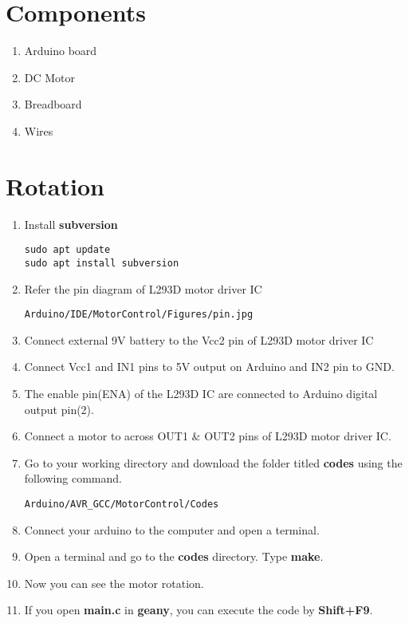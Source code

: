 \documentclass[journal,12pt,twocolumn]{IEEEtran}
\begin{document}
\section{Components}
 \begin{enumerate}
    \item Arduino board
    \item DC Motor
    \item Breadboard
    \item Wires
 \end{enumerate}

\section{Rotation}
\begin{enumerate}
\item Install \textbf{subversion}
\begin{lstlisting}
sudo apt update
sudo apt install subversion
\end{lstlisting}
\item Refer the pin diagram of L293D motor driver IC
    \begin{lstlisting}
Arduino/IDE/MotorControl/Figures/pin.jpg
    \end{lstlisting}
\item Connect external 9V battery to the Vcc2 pin of L293D motor driver IC
\item  Connect Vcc1 and IN1 pins to 5V output on Arduino and IN2 pin to GND.
\item  The enable pin(ENA) of the L293D IC are connected to Arduino digital output pin(2).
\item  Connect a motor to across OUT1 \& OUT2 pins of L293D motor driver IC.
\item Go to your working directory and download the folder titled \textbf{codes} using the following command.
\begin{lstlisting}
Arduino/AVR_GCC/MotorControl/Codes
\end{lstlisting}
\item Connect your arduino to the computer and open a terminal. 
\item Open a terminal and go to  the \textbf{codes} directory.  Type \textbf{make}.
\item Now you can see the motor rotation.
\item If you open \textbf{main.c} in \textbf{geany}, you can execute the code by \textbf{Shift+F9}.
\end{enumerate}
\end{document}
